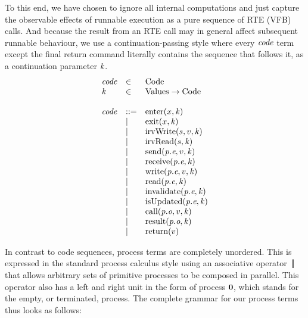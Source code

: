 \documentclass[twocolumn]{article}
\begin{document}
To this end, we have chosen to ignore all internal computations and just capture the observable effects of runnable execution as a pure sequence of RTE (VFB) calls. And because the result from an RTE call may in general affect subsequent runnable behaviour, we use a continuation-passing style where every $\Code$ term except the final return command literally contains the sequence that follows it, as a continuation parameter $\Cont$.
%
\[
\begin{array}{lll}
  \Code & \in & \text{Code}                \\
  \Cont & \in & \text{Values} \rightarrow \text{Code}   \\ \\
  \Code & ::= & \Enter x \Cont               \\
        & |   & \Exit x \Cont                \\
        & |   & \IrvWrite s v \Cont          \\
        & |   & \IrvRead s \Cont             \\
        & |   & \Send {\Te e p} v \Cont      \\
        & |   & \Receive {\Te e p} \Cont     \\
        & |   & \Write {\Te e p} v \Cont     \\
        & |   & \Read {\Te e p} \Cont        \\
        & |   & \Invalidate {\Te e p} \Cont  \\
        & |   & \IsUpdated {\Te e p} \Cont   \\
        & |   & \Call {\To o p} v \Cont      \\
        & |   & \Result {\To o p} \Cont      \\
        & |   & \Return v                    \\
\end{array}
\]

In contrast to code sequences, process terms are completely unordered. This is expressed in the standard process calculus style using an associative operator $\Tpar{}{}$ that allows arbitrary sets of primitive processes to be composed in parallel. This operator also has a left and right unit in the form of process $\textbf{0}$, which stands for the empty, or terminated, process. The complete grammar for our process terms thus looks as follows:
\end{document}
